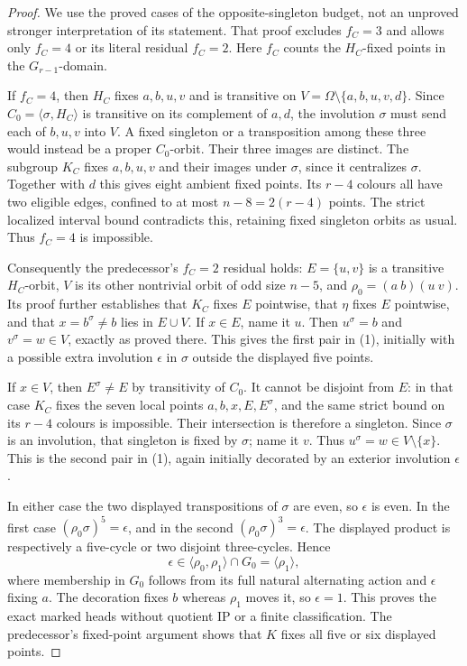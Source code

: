 \documentclass[11pt,a4paper]{article}
\newcommand{\gen}[1]{\langle#1\rangle}
\begin{document}
\begin{proof}
We use the proved cases of the opposite-singleton budget, not an
unproved stronger interpretation of its statement. That proof
excludes $f_C=3$ and allows only $f_C=4$ or its literal residual
$f_C=2$. Here $f_C$ counts the $H_C$-fixed points in the
$G_{r-1}$-domain.

If $f_C=4$, then $H_C$ fixes $a,b,u,v$ and is transitive on
$V=\Omega\setminus\{a,b,u,v,d\}$. Since
$C_0=\gen{\sigma,H_C}$ is transitive on its complement of $a,d$,
the involution $\sigma$ must send each of $b,u,v$ into $V$.
A fixed singleton or a transposition among these three would instead
be a proper $C_0$-orbit. Their three images are distinct.
The subgroup $K_C$ fixes $a,b,u,v$ and their images under $\sigma$,
since it centralizes $\sigma$. Together with $d$ this gives eight
ambient fixed points. Its $r-4$ colours all have two eligible edges,
confined to at most $n-8=2(r-4)$ points. The strict localized interval
bound contradicts this, retaining fixed singleton orbits as usual.
Thus $f_C=4$ is impossible.

Consequently the predecessor's $f_C=2$ residual holds:
$E=\{u,v\}$ is a transitive $H_C$-orbit, $V$ is its other nontrivial
orbit of odd size $n-5$, and $\rho_0=(a\ b)(u\ v)$.
Its proof further establishes that $K_C$ fixes $E$ pointwise,
that $\eta$ fixes $E$ pointwise, and that
$x=b^\sigma\ne b$ lies in $E\cup V$.
If $x\in E$, name it $u$. Then $u^\sigma=b$ and
$v^\sigma=w\in V$, exactly as proved there. This gives the first
pair in (1), initially with a possible extra involution $\epsilon$
in $\sigma$ outside the displayed five points.

If $x\in V$, then $E^\sigma\ne E$ by transitivity of $C_0$.
It cannot be disjoint from $E$: in that case $K_C$ fixes the seven
local points $a,b,x,E,E^\sigma$, and the same strict bound on its
$r-4$ colours is impossible. Their intersection is therefore a
singleton. Since $\sigma$ is an involution, that singleton is fixed
by $\sigma$; name it $v$. Thus $u^\sigma=w\in V\setminus\{x\}$.
This is the second pair in (1), again initially decorated by an
exterior involution $\epsilon$.

In either case the two displayed transpositions of $\sigma$ are
even, so $\epsilon$ is even. In the first case
$(\rho_0\sigma)^5=\epsilon$, and in the second
$(\rho_0\sigma)^3=\epsilon$. The displayed product is respectively
a five-cycle or two disjoint three-cycles. Hence
\[
 \epsilon\in\gen{\rho_0,\rho_1}\cap G_0=\gen{\rho_1},
\]
where membership in $G_0$ follows from its full natural alternating
action and $\epsilon$ fixing $a$. The decoration fixes $b$ whereas
$\rho_1$ moves it, so $\epsilon=1$. This proves the exact marked
heads without quotient IP or a finite classification.
The predecessor's fixed-point argument shows that $K$ fixes all
five or six displayed points.


\end{proof}
\end{document}

